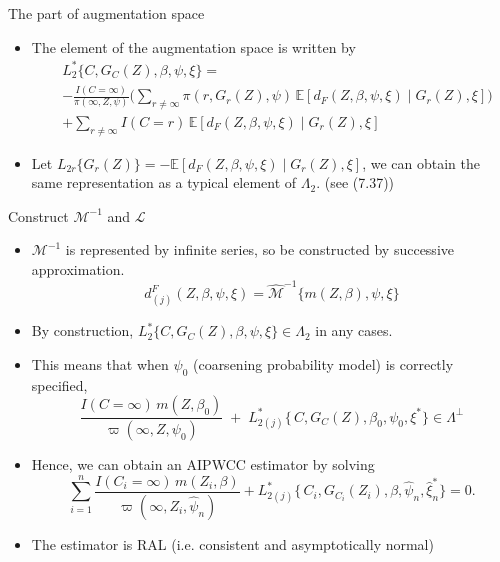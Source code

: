 \documentclass[xcolor=dvipsnames,aspectratio=169]{beamer}
\newcommand{\E}{\mathbb{E}}
\newcommand{\1}{\mathbbm{1}}
\begin{document}
\begin{frame}{The part of augmentation space}
  \begin{tcolorbox}[colframe=Cyan,title=Theorem 10.7 - (ii)]
    \begin{itemize}
        \item The element of the augmentation space is written by
        \begin{align*}
          &L^{\ast}_2\{C,G_C(Z),\beta,\psi,\xi\}
            =\\  &- \frac{I(C=\infty)}{\pi(\infty,Z,\psi)}
            \Bigg(\sum_{r\neq\infty}\pi(r,G_r(Z),\psi)\,
            \E[d_F(Z,\beta,\psi,\xi)\mid G_r(Z),\xi]\Bigg) \\
            &+ \sum_{r\neq\infty} I(C=r)\,
            \E[d_F(Z,\beta,\psi,\xi)\mid G_r(Z),\xi]
        \end{align*}
    \end{itemize}
\end{tcolorbox}
\begin{itemize}
  \item Let $L_{2r}\{G_r(Z)\}=-\E[d_F(Z,\beta,\psi,\xi)\mid G_r(Z),\xi]$, we can obtain the same representation as a typical element of $\Lambda_2$. (see (7.37))
\end{itemize}
\end{frame}

\begin{frame}{Construct $\mathcal{M}^{-1}$ and $\mathcal{L}$}
  \begin{itemize}
    \item $\mathcal{M}^{-1}$ is represented by infinite series, so be constructed by successive approximation.
    \[
    d^F_{(j)}(Z,\beta,\psi,\xi) = \hat{\mathcal{M}}^{-1}\{m(Z,\beta),\psi,\xi\}
    \]
    \item By construction, $L^{\ast}_2\{C,G_C(Z),\beta,\psi,\xi\}\in \Lambda_2$ in any cases.
    \item This means that when $\psi_0$ (coarsening probability model) is correctly specified, 
    \[
    \frac{I(C=\infty)\,m(Z,\beta_{0})}{\varpi(\infty,Z,\psi_{0})}
\;+\;
L^{\ast}_{2(j)}\{\,C,G_{C}(Z),\beta_{0},\psi_{0},\xi^{\ast}\}\in \Lambda^{\perp}
    \]
    \item Hence, we can obtain an AIPWCC estimator by solving
    \[
    \sum_{i=1}^{n}
  \frac{I(C_{i}=\infty)\,m(Z_{i},\beta)}
       {\varpi(\infty,Z_{i},\hat{\psi}_{n})}
  + L^{\ast}_{2(j)}\{\,C_{i},G_{C_{i}}(Z_{i}),\beta,\hat{\psi}_{n},\hat{\xi}^{\ast}_{n}\}
= 0.
    \]
    \item The estimator is RAL (i.e. consistent and asymptotically normal)
  \end{itemize}
\end{frame}
\end{document}
